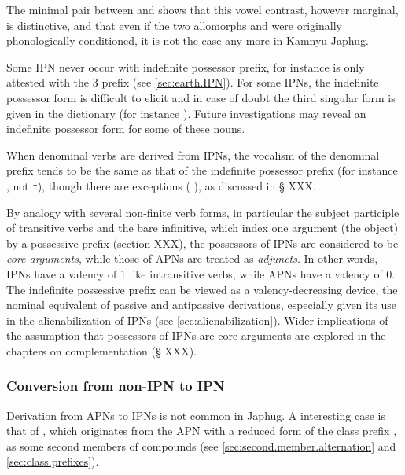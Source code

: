 The minimal pair between  and  shows that this vowel contrast, however marginal, is distinctive, and that even if the two allomorphs  and  were originally phonologically conditioned, it is not the case any more in Kamnyu Japhug.

Some IPN never occur with indefinite possessor prefix, for instance  is only attested with the 3\sg{}  prefix (see \ref{sec:earth.IPN}). For some IPNs, the indefinite possessor form is difficult to elicit and in case of doubt the third singular form is given in the dictionary \citet{jacques16japhug} (for instance ). Future investigations may reveal an indefinite possessor form for some of these nouns.

When denominal verbs are derived from IPNs, the vocalism of the denominal prefix tends to be the same as that of the  indefinite possessor prefix (for instance  \fl{} , not $\dagger$), though there are exceptions ( \fl{} ), as discussed in § XXX.

By analogy with several non-finite verb forms, in particular the subject participle of transitive verbs and the bare infinitive, which index one argument (the object) by a possessive prefix (section XXX), the possessors of IPNs are considered to be \textit{core arguments}, while those of APNs are treated as \textit{adjuncts}. In other words, IPNs have a valency of 1 like intransitive verbs, while APNs have a valency of 0. The indefinite possessive prefix can be viewed as a valency-decreasing device, the nominal equivalent of passive and antipassive derivations, especially given its use in the alienabilization of IPNs (see \ref{sec:alienabilization}). Wider implications of the assumption that possessors of IPNs are core arguments are explored in the chapters on complementation (§  XXX).

\subsubsection{Conversion from non-IPN to IPN} \label{sec:apn.to.ipn}
Derivation from APNs to IPNs is not common in Japhug. A interesting case is that of , which originates from the APN  with a reduced form  of the class prefix , as some second members of compounds (see \ref{sec:second.member.alternation} and \ref{sec:class.prefixes}).

